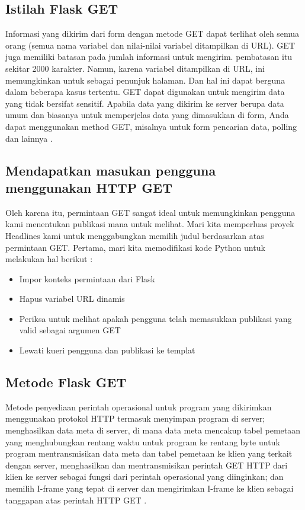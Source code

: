 \subsection{Istilah Flask GET}
Informasi yang dikirim dari form dengan metode GET dapat terlihat oleh semua orang (semua nama variabel dan nilai-nilai variabel ditampilkan di URL). GET juga memiliki batasan pada jumlah informasi untuk mengirim. pembatasan itu sekitar 2000 karakter. Namun, karena variabel ditampilkan di URL, ini memungkinkan untuk sebagai penunjuk halaman. Dan hal ini dapat berguna dalam beberapa kasus tertentu. GET dapat digunakan untuk mengirim data yang tidak bersifat sensitif.
Apabila data yang dikirim ke server berupa data umum dan biasanya untuk memperjelas data yang dimasukkan di form, Anda dapat menggunakan method GET, misalnya untuk form pencarian data, polling dan lainnya \cite{grinberg2018flask}.
\subsection{Mendapatkan masukan pengguna menggunakan HTTP GET}
Oleh karena itu, permintaan GET sangat ideal untuk memungkinkan pengguna kami menentukan publikasi mana untuk melihat. Mari kita memperluas proyek Headlines kami untuk menggabungkan memilih judul berdasarkan atas permintaan GET. Pertama, mari kita memodifikasi kode Python untuk melakukan hal berikut \cite{dwyer2016flask}:
\begin{itemize}
\item Impor konteks permintaan dari Flask
\item Hapus variabel URL dinamis
\item Periksa untuk melihat apakah pengguna telah memasukkan publikasi yang valid sebagai argumen GET
\item Lewati kueri pengguna dan publikasi ke templat
\end{itemize}
\subsection{Metode Flask GET}
Metode penyediaan perintah operasional untuk program  yang dikirimkan menggunakan protokol HTTP termasuk menyimpan program  di server; menghasilkan data meta di server, di mana data meta mencakup tabel pemetaan yang menghubungkan rentang waktu untuk program  ke rentang byte untuk program  mentransmisikan data meta dan tabel pemetaan ke klien yang terkait dengan server, menghasilkan dan mentransmisikan perintah GET HTTP dari klien  ke server sebagai fungsi dari perintah operasional yang diinginkan; dan memilih I-frame yang tepat di server dan mengirimkan I-frame ke klien sebagai tanggapan atas perintah HTTP GET \cite{xu2006method}.
